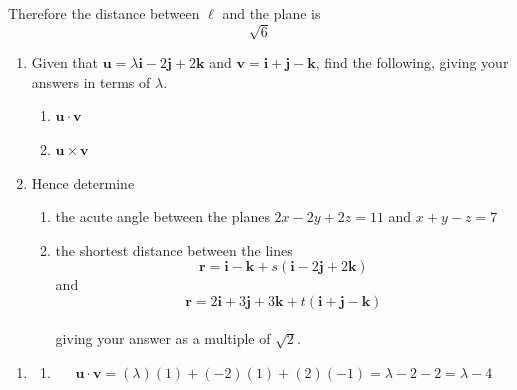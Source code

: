 \documentclass[leqno]{article}
\begin{document}
\begin{enumerate}[
  label=\textbf{\arabic*.},
  leftmargin=*,
  topsep=0pt,
  partopsep=0pt,
  parsep=0pt
]
\begin{djsSolution}
\begin{enumerate}[label=\textbf{(\alph*)}]
\begin{enumerate}[label=(\roman*)]
Therefore the distance between $\ell$ and the plane is
\[
\sqrt6
\]
  \end{enumerate}
\end{enumerate}
\end{djsSolution}


\newpage

\questionitem

\begin{enumerate}[label=\textbf{(\alph*)}]
  \item Given that $\mathbf{u}=\lambda\mathbf{i}-2\mathbf{j}+2\mathbf{k}$ and $\mathbf{v}=\mathbf{i}+\mathbf{j}-\mathbf{k}$, find the following, giving your answers in terms of $\lambda$. 
  \begin{enumerate}[label=(\roman*)]
    \item $\mathbf{u}\cdot\mathbf{v}$ 
    \item $\mathbf{u}\times\mathbf{v}$  \\
  \end{enumerate}
  \item Hence determine
  \begin{enumerate}[label=(\roman*)]
    \item the acute angle between the planes $2x-2y+2z=11$ and $x+y-z=7$ 
    \item the shortest distance between the lines
    \[
    \mathbf{r}=\mathbf{i}-\mathbf{k}+s(\mathbf{i}-2\mathbf{j}+2\mathbf{k})
    \] 
    and
    \[
    \mathbf{r}=2\mathbf{i}+3\mathbf{j}+3\mathbf{k}+t(\mathbf{i}+\mathbf{j}-\mathbf{k})
    \]\\
    giving your answer as a multiple of $\sqrt{2}$. 
  \end{enumerate}
\end{enumerate}

\vspace*{10pt}

\begin{djsSolution}
\begin{enumerate}[label=\textbf{(\alph*)}]
  \item
  \begin{enumerate}[label=(\roman*)]
    \item
    \[
    \mathbf{u}\cdot\mathbf{v}
    =(\lambda)(1)+(-2)(1)+(2)(-1)
    =\lambda-2-2
    =\lambda-4
    \]


\end{enumerate}
\end{enumerate}
\end{djsSolution}
\end{enumerate}
\end{document}
